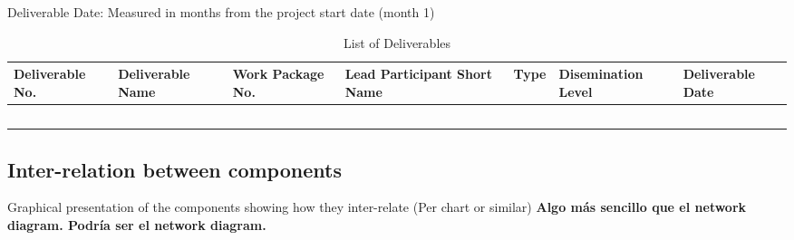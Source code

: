 Deliverable Date: Measured in months from the project start date (month 1)

\begin{longtable}[H]{p{1.8cm} p{2cm} p{1.3cm} p{1.8cm} p{1.3cm} p{2.1cm} p{1.8cm}}
	\toprule[2pt]
	
	\textbf{Deliverable No.} & \textbf{Deliverable Name} & \textbf{Work Package No.} & \textbf{Lead Participant Short Name} & \textbf{Type} & \textbf{Disemination Level} & \textbf{Deliverable Date} \\
	
	\midrule[1.5pt] 
	\endhead
	
	&  &  &  &  &  & \vspace{0.2cm} \\
	
	\midrule

	 &  &  &  &  &  & \vspace{0.2cm} \\
	
	\midrule
	
	 &  &  &  &  &  &  \vspace{0.2cm} \\

	\midrule

 	 &  &  &  &  &  &  \vspace{0.2cm} \\
	
	\bottomrule[2pt]
	
	\caption{List of Deliverables}
	\label{workpackages}
\end{longtable}


\subsection{Inter-relation between components}

Graphical presentation of the components showing how they inter-relate (Per chart or similar) \textbf{Algo más sencillo que el network diagram. Podría ser el network diagram.}


